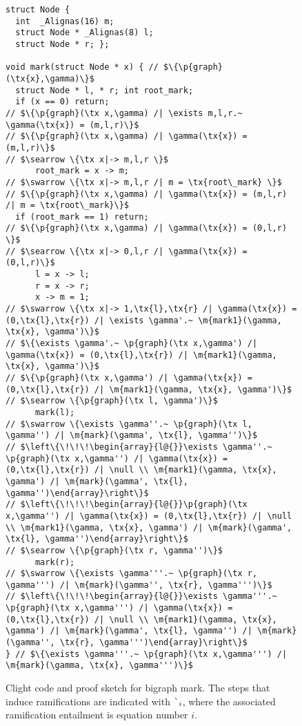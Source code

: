\begin{figure}[t]
  \begin{lstlisting}
struct Node {
  int  _Alignas(16) m;
  struct Node * _Alignas(8) l;
  struct Node * r; };

void mark(struct Node * x) { // $\{\p{graph}(\tx{x},\gamma)\}$
  struct Node * l, * r; int root_mark;
  if (x == 0) return;
// $\{\p{graph}(\tx x,\gamma) /| \exists m,l,r.~ \gamma(\tx{x}) = (m,l,r)\}$
// $\{\p{graph}(\tx x,\gamma) /| \gamma(\tx{x}) = (m,l,r)\}$
// $\searrow \{\tx x|-> m,l,r \}$
      root_mark = x -> m;
// $\swarrow \{\tx x|-> m,l,r /| m = \tx{root\_mark} \}$
// $\{\p{graph}(\tx x,\gamma) /| \gamma(\tx{x}) = (m,l,r) /| m = \tx{root\_mark}\}$
  if (root_mark == 1) return;
// $\{\p{graph}(\tx x,\gamma) /| \gamma(\tx{x}) = (0,l,r) \}$
// $\searrow \{\tx x|-> 0,l,r /| \gamma(\tx{x}) = (0,l,r)\}$
      l = x -> l;
      r = x -> r;
      x -> m = 1;
// $\swarrow \{\tx x|-> 1,\tx{l},\tx{r} /| \gamma(\tx{x}) = (0,\tx{l},\tx{r}) /| \exists \gamma'.~ \m{mark1}(\gamma, \tx{x}, \gamma')\}$
// $\{\exists \gamma'.~ \p{graph}(\tx x,\gamma') /| \gamma(\tx{x}) = (0,\tx{l},\tx{r}) /| \m{mark1}(\gamma, \tx{x}, \gamma')\}$
// $\{\p{graph}(\tx x,\gamma') /| \gamma(\tx{x}) = (0,\tx{l},\tx{r}) /| \m{mark1}(\gamma, \tx{x}, \gamma')\}$
// $\searrow \{\p{graph}(\tx l, \gamma')\}$
      mark(l);
// $\swarrow \{\exists \gamma''.~ \p{graph}(\tx l, \gamma'') /| \m{mark}(\gamma', \tx{l}, \gamma'')\}$
// $\left\{\!\!\!\begin{array}{l@{}}\exists \gamma''.~ \p{graph}(\tx x,\gamma'') /| \gamma(\tx{x}) = (0,\tx{l},\tx{r}) /| \null \\ \m{mark1}(\gamma, \tx{x}, \gamma') /| \m{mark}(\gamma', \tx{l}, \gamma'')\end{array}\right\}$
// $\left\{\!\!\!\begin{array}{l@{}}\p{graph}(\tx x,\gamma'') /| \gamma(\tx{x}) = (0,\tx{l},\tx{r}) /| \null \\ \m{mark1}(\gamma, \tx{x}, \gamma') /| \m{mark}(\gamma', \tx{l}, \gamma'')\end{array}\right\}$
// $\searrow \{\p{graph}(\tx r, \gamma'')\}$
      mark(r);
// $\swarrow \{\exists \gamma'''.~ \p{graph}(\tx r, \gamma''') /| \m{mark}(\gamma'', \tx{r}, \gamma''')\}$
// $\left\{\!\!\!\begin{array}{l@{}}\exists \gamma'''.~ \p{graph}(\tx x,\gamma''') /| \gamma(\tx{x}) = (0,\tx{l},\tx{r}) /| \null \\ \m{mark1}(\gamma, \tx{x}, \gamma') /| \m{mark}(\gamma', \tx{l}, \gamma'') /| \m{mark}(\gamma'', \tx{r}, \gamma''')\end{array}\right\}$
} // $\{\exists \gamma'''.~ \p{graph}(\tx x,\gamma''') /| \m{mark}(\gamma, \tx{x}, \gamma''')\}$
\end{lstlisting}
\caption{Clight code and proof sketch for bigraph mark. {\color{magenta} The steps that induce
  ramifications are indicated with $\lightning_i$, where the associated ramification entailment is equation number $i$.}} %
\label{fig:markgraph}
\end{figure}
